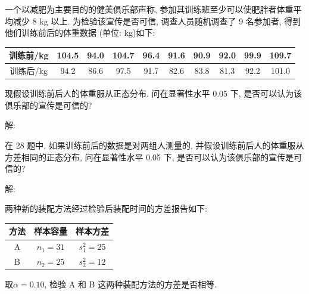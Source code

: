 \documentclass[standard]{ExBook}
\begin{document}
\begin{qitems}
    \begin{bbox}
    \begin{shaded}
        \qitem
一个以减肥为主要目的的健美俱乐部声称, 参加其训练班至少可以使肥胖者体重平均减少 8 kg 以上. 为检验该宣传是否可信, 调查人员随机调查了 9 名参加者, 得到他们训练前后的体重数据 (单位: kg)如下:
\begin{center}
\setlength{\tabcolsep}{11.5pt}
\begin{tabular}{c|ccccccccc}
\hline
训练前/kg & 104.5 & 94.0 & 104.7 & 96.4 & 91.6 & 90.9 & 92.0 & 99.9 & 109.7\\
\hline
训练后/kg & 94.2 & 86.6 & 97.5 & 91.7 & 82.6 & 83.8 & 81.3 & 92.2 & 101.0\\
\hline
\end{tabular}
\end{center}
现假设训练前后人的体重服从正态分布. 问在显著性水平 0.05 下, 是否可以认为该俱乐部的宣传是可信的?
    \end{shaded}
    \end{bbox}

\vspace{-5em}

    \begin{bbox}
解: 
    \end{bbox}

\vspace{-5em}

    \begin{bbox}
    \begin{shaded}
        \qitem
在 28 题中, 如果训练前后的数据是对两组人测量的, 并假设训练前后人的体重服从方差相同的正态分布, 问在显著性水平 0.05 下, 是否可以认为该俱乐部的宣传是可信的?
    \end{shaded}
    \end{bbox}

\vspace{-5em}

    \begin{bbox}
解: 
    \end{bbox}

\vspace{-5em}

    \begin{bbox}
    \begin{shaded}
        \qitem
两种新的装配方法经过检验后装配时间的方差报告如下:
\begin{center}
\setlength{\tabcolsep}{60pt}
\begin{tabular}{c|cc}
\hline
方法 & 样本容量 & 样本方差\\
\hline
A & $n_1=31$ & $s_1^2=25$\\
B & $n_2=25$ & $s_2^2=12$\\
\hline
\end{tabular}
\end{center}
取$\alpha=0.10$, 检验 A 和 B 这两种装配方法的方差是否相等.
    \end{shaded}
    \end{bbox}


\end{qitems}
\end{document}
